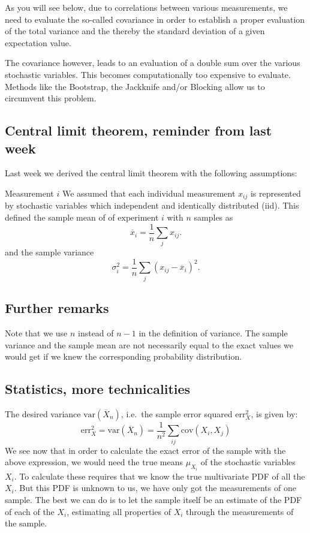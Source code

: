 \documentclass[%
oneside,                 %
final,                   %
10pt]{article}
\begin{document}
As you will see below, due to correlations between various
measurements, we need to evaluate the so-called covariance in order to
establish a proper evaluation of the total variance and the thereby
the standard deviation of a given expectation value.

The covariance however, leads to an evaluation of a double sum over the various stochastic variables. This becomes computationally too expensive to evaluate.
Methods like the Bootstrap, the Jackknife and/or Blocking allow us to circumvent this problem. 

\subsection{Central limit theorem, reminder from last week}

Last week we derived the central limit theorem with the following assumptions:

\begin{block}{Measurement $i$ }
We assumed that each individual measurement $x_{ij}$ is represented by stochastic variables which independent and identically distributed (iid).
This defined the sample mean of of experiment $i$ with $n$ samples as
\[
\overline{x}_i=\frac{1}{n}\sum_{j} x_{ij}.
\]
and the sample variance
\[
\sigma^2_i=\frac{1}{n}\sum_{j} \left(x_{ij}-\overline{x}_i\right)^2.
\]
\end{block}

\subsection{Further remarks}

Note that we use $n$ instead of $n-1$ in the definition of
variance. The sample variance and the sample mean are not necessarily equal to
the exact values we would get if we knew the corresponding probability
distribution.

\subsection{Statistics, more technicalities}
\begin{block}{}
The desired variance
$\mathrm{var}(\overline X_n)$, i.e.~the sample error squared
$\mathrm{err}_X^2$, is given by:
\begin{equation}
\mathrm{err}_X^2 = \mathrm{var}(\overline X_n) = \frac{1}{n^2}
\sum_{ij} \mathrm{cov}(X_i, X_j)
\label{eq:error_exact}
\end{equation}
We see now that in order to calculate the exact error of the sample
with the above expression, we would need the true means
$\mu_{X_i}^{\phantom X}$ of the stochastic variables $X_i$. To
calculate these requires that we know the true multivariate PDF of all
the $X_i$. But this PDF is unknown to us, we have only got the measurements of
one sample. The best we can do is to let the sample itself be an
estimate of the PDF of each of the $X_i$, estimating all properties of
$X_i$ through the measurements of the sample.
\end{block}
\end{document}
